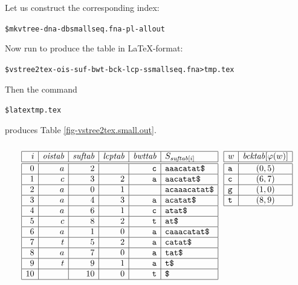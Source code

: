 \documentclass[12pt,titlepage]{article}
\newcommand{\LCP}[0]{\mathit{lcptab}}
\newcommand{\SUF}[0]{\mathit{suftab}}
\newcommand{\BCK}[0]{\mathit{bcktab}}
\newcommand{\OIS}[0]{\mathit{oistab}}
\newcommand{\BWT}[0]{\mathit{bwttab}}
\newenvironment{LargeOutput}{%
 \begin{footnotesize}
 \begin{alltt}}{%
 \end{alltt}
 \end{footnotesize}%
 \addvspace{-\medskipamount}
}
\begin{document}
Let us construct the corresponding index:

\begin{LargeOutput}
\$ mkvtree -dna -db smallseq.fna -pl -allout
\end{LargeOutput}

Now run \VtoTex to produce the 
table in \LaTeX-format:

\begin{LargeOutput}
\$ vstree2tex -ois -suf -bwt -bck -lcp -s smallseq.fna > tmp.tex
\end{LargeOutput}

Then the command

\begin{LargeOutput}
\$ latex tmp.tex
\end{LargeOutput}

produces Table \ref{fig-vstree2tex.small.out}.

\begin{table}
\caption{The output of \VtoTex after applying \LaTeX\ to it.}
\label{fig-vstree2tex.small.out}
 \[
 \begin{array}{l@{~~}l}
 \begin{array}[t]{*{5}{|r}|l|}\hline
 i &\OIS &\SUF &\LCP &\BWT &S_{\SUF[i]} \\\hline\hline
 0 &a &2 &       &\texttt{c} &\texttt{aaacatat\symbol{36}}
 \\\hline
 1 &c &3 &2 &\texttt{a} &\texttt{aacatat\symbol{36}}
 \\\hline
 2 &a &0 &1 &           &\texttt{acaaacatat\symbol{36}}
 \\\hline
 3 &a &4 &3 &\texttt{a} &\texttt{acatat\symbol{36}}
 \\\hline
 4 &a &6 &1 &\texttt{c} &\texttt{atat\symbol{36}}
 \\\hline
 5 &c &8 &2 &\texttt{t} &\texttt{at\symbol{36}}
 \\\hline
 6 &a &1 &0 &\texttt{a} &\texttt{caaacatat\symbol{36}}
 \\\hline
 7 &t &5 &2 &\texttt{a} &\texttt{catat\symbol{36}}
 \\\hline
 8 &a &7 &0 &\texttt{a} &\texttt{tat\symbol{36}}
 \\\hline
 9 &t &9 &1 &\texttt{a} &\texttt{t\symbol{36}}
 \\\hline
 10 &  &10 &0 &\texttt{t} &\texttt{\symbol{36}}
 \\\hline
 \end{array}
& \begin{array}[t]{|l|c|}\hline
 w&\BCK[\varphi(w)]\\\hline\hline
 \texttt{a}&(0,5) \\\hline
 \texttt{c}&(6,7) \\\hline
 \texttt{g}&(1,0) \\\hline
 \texttt{t}&(8,9) \\\hline
 \end{array}
 \end{array}
\]
\end{table}
\end{document}
